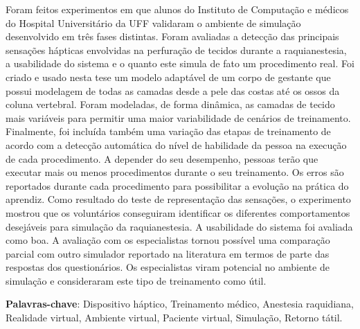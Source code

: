 \begin{resumo}
Foram feitos experimentos em que alunos do Instituto de Computação e médicos do Hospital Universitário da UFF validaram o ambiente de simulação desenvolvido em três fases distintas. Foram avaliadas a detecção das principais sensações hápticas envolvidas na perfuração de tecidos durante a raquianestesia, a usabilidade do sistema e o quanto este simula de fato um procedimento real. Foi criado e usado nesta tese um modelo adaptável de um corpo de gestante que possui modelagem de todas as camadas desde a pele das costas até os ossos da coluna vertebral. Foram modeladas, de forma dinâmica, as camadas de tecido mais variáveis para permitir uma maior variabilidade de cenários de treinamento. Finalmente, foi incluída também uma variação das etapas de treinamento de acordo com a detecção automática do nível de habilidade da pessoa na execução de cada procedimento. A depender do seu desempenho, pessoas terão que executar mais ou menos procedimentos durante o seu treinamento. Os erros são reportados durante cada procedimento para possibilitar a evolução na prática do aprendiz. Como resultado do teste de representação das sensações, o experimento mostrou que os voluntários conseguiram identificar os diferentes comportamentos desejáveis para simulação da raquianestesia. A usabilidade do sistema foi avaliada como boa. A avaliação com os especialistas tornou possível uma comparação parcial com outro simulador reportado na literatura em termos de parte das respostas dos questionários. Os especialistas viram potencial no ambiente de simulação e consideraram este tipo de treinamento como útil. 

{\hspace{-8mm} \bf{Palavras-chave}}: Dispositivo háptico, Treinamento médico, Anestesia raquidiana, Realidade virtual, Ambiente virtual, Paciente virtual, Simulação, Retorno tátil.

\end{resumo}

